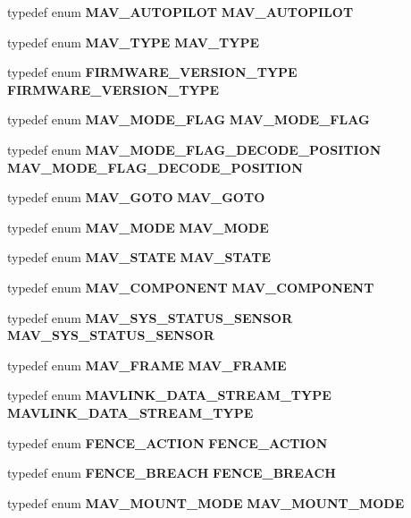 \begin{DoxyCompactItemize}
\item 
typedef enum \textbf{ M\+A\+V\+\_\+\+A\+U\+T\+O\+P\+I\+L\+OT} \textbf{ M\+A\+V\+\_\+\+A\+U\+T\+O\+P\+I\+L\+OT}
\item 
typedef enum \textbf{ M\+A\+V\+\_\+\+T\+Y\+PE} \textbf{ M\+A\+V\+\_\+\+T\+Y\+PE}
\item 
typedef enum \textbf{ F\+I\+R\+M\+W\+A\+R\+E\+\_\+\+V\+E\+R\+S\+I\+O\+N\+\_\+\+T\+Y\+PE} \textbf{ F\+I\+R\+M\+W\+A\+R\+E\+\_\+\+V\+E\+R\+S\+I\+O\+N\+\_\+\+T\+Y\+PE}
\item 
typedef enum \textbf{ M\+A\+V\+\_\+\+M\+O\+D\+E\+\_\+\+F\+L\+AG} \textbf{ M\+A\+V\+\_\+\+M\+O\+D\+E\+\_\+\+F\+L\+AG}
\item 
typedef enum \textbf{ M\+A\+V\+\_\+\+M\+O\+D\+E\+\_\+\+F\+L\+A\+G\+\_\+\+D\+E\+C\+O\+D\+E\+\_\+\+P\+O\+S\+I\+T\+I\+ON} \textbf{ M\+A\+V\+\_\+\+M\+O\+D\+E\+\_\+\+F\+L\+A\+G\+\_\+\+D\+E\+C\+O\+D\+E\+\_\+\+P\+O\+S\+I\+T\+I\+ON}
\item 
typedef enum \textbf{ M\+A\+V\+\_\+\+G\+O\+TO} \textbf{ M\+A\+V\+\_\+\+G\+O\+TO}
\item 
typedef enum \textbf{ M\+A\+V\+\_\+\+M\+O\+DE} \textbf{ M\+A\+V\+\_\+\+M\+O\+DE}
\item 
typedef enum \textbf{ M\+A\+V\+\_\+\+S\+T\+A\+TE} \textbf{ M\+A\+V\+\_\+\+S\+T\+A\+TE}
\item 
typedef enum \textbf{ M\+A\+V\+\_\+\+C\+O\+M\+P\+O\+N\+E\+NT} \textbf{ M\+A\+V\+\_\+\+C\+O\+M\+P\+O\+N\+E\+NT}
\item 
typedef enum \textbf{ M\+A\+V\+\_\+\+S\+Y\+S\+\_\+\+S\+T\+A\+T\+U\+S\+\_\+\+S\+E\+N\+S\+OR} \textbf{ M\+A\+V\+\_\+\+S\+Y\+S\+\_\+\+S\+T\+A\+T\+U\+S\+\_\+\+S\+E\+N\+S\+OR}
\item 
typedef enum \textbf{ M\+A\+V\+\_\+\+F\+R\+A\+ME} \textbf{ M\+A\+V\+\_\+\+F\+R\+A\+ME}
\item 
typedef enum \textbf{ M\+A\+V\+L\+I\+N\+K\+\_\+\+D\+A\+T\+A\+\_\+\+S\+T\+R\+E\+A\+M\+\_\+\+T\+Y\+PE} \textbf{ M\+A\+V\+L\+I\+N\+K\+\_\+\+D\+A\+T\+A\+\_\+\+S\+T\+R\+E\+A\+M\+\_\+\+T\+Y\+PE}
\item 
typedef enum \textbf{ F\+E\+N\+C\+E\+\_\+\+A\+C\+T\+I\+ON} \textbf{ F\+E\+N\+C\+E\+\_\+\+A\+C\+T\+I\+ON}
\item 
typedef enum \textbf{ F\+E\+N\+C\+E\+\_\+\+B\+R\+E\+A\+CH} \textbf{ F\+E\+N\+C\+E\+\_\+\+B\+R\+E\+A\+CH}
\item 
typedef enum \textbf{ M\+A\+V\+\_\+\+M\+O\+U\+N\+T\+\_\+\+M\+O\+DE} \textbf{ M\+A\+V\+\_\+\+M\+O\+U\+N\+T\+\_\+\+M\+O\+DE}

\end{DoxyCompactItemize}
